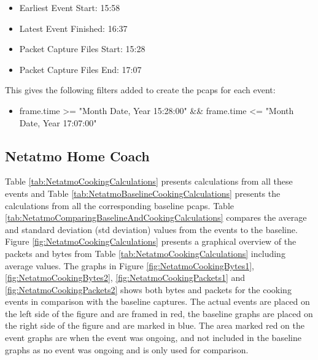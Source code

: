 \begin{itemize}
    \item Earliest Event Start: 15:58
    \item Latest Event Finished: 16:37
    \item Packet Capture Files Start: 15:28
    \item Packet Capture Files End: 17:07
\end{itemize}

This gives the following filters added to create the pcaps for each event:

\begin{itemize}
    \item frame.time >= "Month Date, Year 15:28:00" && frame.time <= "Month Date, Year 17:07:00"
\end{itemize}

\newpage
\subsection{Netatmo Home Coach}
Table \ref{tab:NetatmoCookingCalculations} presents calculations from all these events and Table \ref{tab:NetatmoBaselineCookingCalculations} presents the calculations from all the corresponding baseline pcaps. Table \ref{tab:NetatmoComparingBaselineAndCookingCalculations} compares the average and standard deviation (std deviation) values from the events to the baseline. Figure \ref{fig:NetatmoCookingCalculations} presents a graphical overview of the packets and bytes from Table \ref{tab:NetatmoCookingCalculations} including average values. The graphs in Figure \ref{fig:NetatmoCookingBytes1}, \ref{fig:NetatmoCookingBytes2}, \ref{fig:NetatmoCookingPackets1} and \ref{fig:NetatmoCookingPackets2} shows both bytes and packets for the cooking events in comparison with the baseline captures. The actual events are placed on the left side of the figure and are framed in red, the baseline graphs are placed on the right side of the figure and are marked in blue. The area marked red on the event graphs are when the event was ongoing, and not included in the baseline graphs as no event was ongoing and is only used for comparison. 

